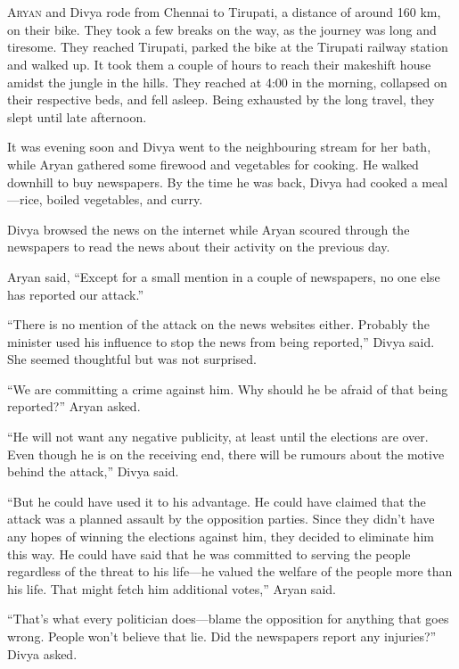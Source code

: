 \chapter{}
\lettrine{A}{ryan} and Divya rode from Chennai to Tirupati, a distance of around
160 km, on their bike.  They took a few breaks on the way, as the journey was
long and tiresome. They reached Tirupati, parked the bike at the Tirupati
railway station and walked up.  It took them a couple of hours to reach their
makeshift house amidst the jungle in the hills. They reached at 4:00 in the
morning, collapsed on their respective beds, and fell asleep. Being exhausted by
the long travel, they slept until late afternoon.

It was evening soon and Divya went to the neighbouring stream for her bath, while Aryan
gathered some firewood and vegetables for cooking. He walked downhill to buy
newspapers. By the time he was back, Divya had cooked a meal—rice, boiled
vegetables, and curry.

Divya browsed the news on the internet while Aryan scoured through the newspapers to read
the news about their activity on the previous day.

Aryan said, “Except for a small mention in a couple of newspapers, no one else
has reported our attack.”

“There is no mention of the attack on the news websites either. Probably the
minister used his influence to stop the news from being reported,” Divya said.
She seemed thoughtful but was not surprised.

“We are committing a crime against him. Why should he be afraid of that being
reported?” Aryan asked.

“He will not want any negative publicity, at least until the elections are over.
Even though he is on the receiving end, there will be rumours about the motive
behind the attack,” Divya said.

“But he could have used it to his advantage. He could have claimed that the
attack was a planned assault by the opposition parties. Since they didn't have
any hopes of winning the elections against him, they decided to eliminate him
this way. He could have said that he was committed to serving the people
regardless of the threat to his life—he valued the welfare of the people more
than his life. That might fetch him additional votes,” Aryan said.

“That's what every politician does—blame the opposition for anything that goes
wrong. People won't believe that lie. Did the newspapers report any injuries?”
Divya asked.

